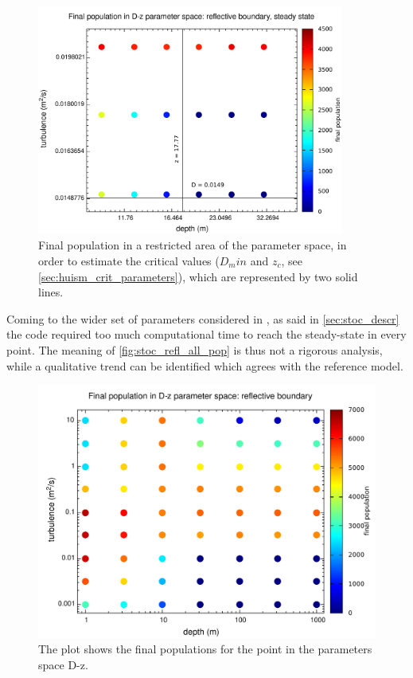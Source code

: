 \begin{figure} 
    \includegraphics[width=0.9\textwidth]{data/1D_model/reflective_bottom/bottom_right_zoom/bloom_pop}
    \caption{Final population in a restricted area of the parameter space, in order to estimate the critical values ($D_min$ and $z_c$, see \autoref{sec:huism_crit_parameters}), which are represented by two solid lines.}
    \label{fig:stoc_subset_steady_pop_zoom}
\end{figure}

Coming to the wider set of parameters considered in \autocite{Huisman2002HowPersist}, as said in \autoref{sec:stoc_descr} the code required too much computational time to reach the steady-state in every point. The meaning of \autoref{fig:stoc_refl_all_pop} is thus not a rigorous analysis, while a qualitative trend can be identified which agrees with the reference model. 

\begin{figure} 
  \includegraphics[width=\textwidth]{data/1D_model/reflective_bottom/global/bloom_pop}
  \caption{The plot shows the final populations for the point in the parameters space D-z.}
  \label{fig:stoc_refl_all_pop}
\end{figure}

